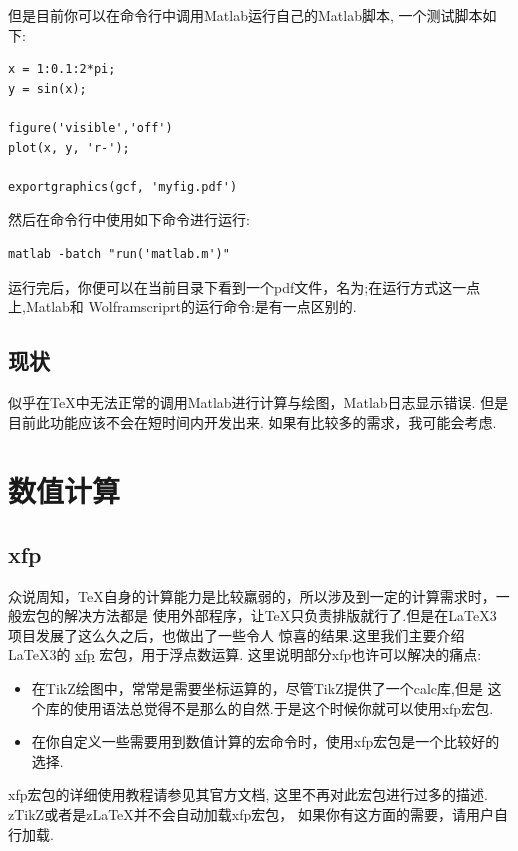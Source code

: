 但是目前你可以在命令行中调用Matlab运行自己的Matlab脚本, 一个测试脚本如下:
\begin{verbatim}
x = 1:0.1:2*pi;
y = sin(x);

figure('visible','off')
plot(x, y, 'r-');

exportgraphics(gcf, 'myfig.pdf') 
\end{verbatim}

然后在命令行中使用如下命令进行运行:
\begin{verbatim}
matlab -batch "run('matlab.m')"
\end{verbatim}

运行完后，你便可以在当前目录下看到一个pdf文件，名为;在运行方式这一点上,Matlab和
Wolframscriprt的运行命令:是有一点区别的.

\subsection{现状}
似乎在\TeX{}中无法正常的调用Matlab进行计算与绘图，Matlab日志显示错误. 但是目前此功能应该不会在短时间内开发出来.
如果有比较多的需求，我可能会考虑.

\section{数值计算}
\subsection{xfp}
众说周知，\TeX{}自身的计算能力是比较羸弱的，所以涉及到一定的计算需求时，一般宏包的解决方法都是
使用外部程序，让\TeX{}只负责排版就行了.但是在\LaTeX3 项目发展了这么久之后，也做出了一些令人 
惊喜的结果.这里我们主要介绍\LaTeX3的 \href{https://www.ctan.org/pkg/xfp}{xfp} 宏包，用于浮点数运算. 
这里说明部分{xfp}也许可以解决的痛点: 

\begin{itemize}
    \item 在TikZ绘图中，常常是需要坐标运算的，尽管TikZ提供了一个{calc}库,但是
        这个库的使用语法总觉得不是那么的自然.于是这个时候你就可以使用{xfp}宏包.
    \item 在你自定义一些需要用到数值计算的宏命令时，使用{xfp}宏包是一个比较好的选择.
\end{itemize}

{xfp}宏包的详细使用教程请参见其官方文档, 这里不再对此宏包进行过多的描述. zTikZ或者是z\LaTeX{}并不会自动加载{xfp}宏包，
如果你有这方面的需要，请用户自行加载.



